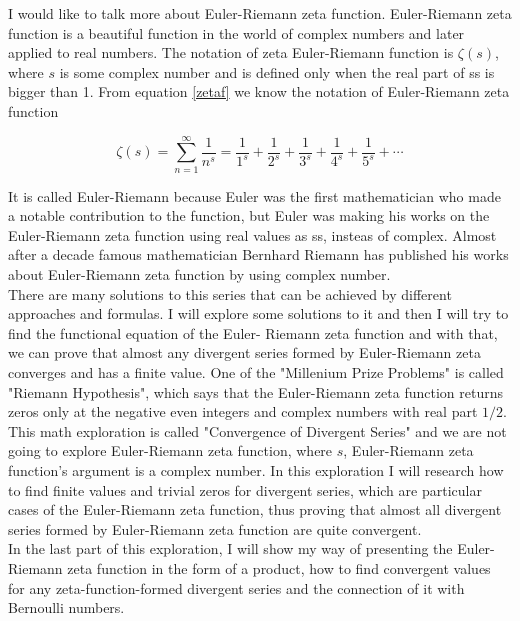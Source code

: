 \documentclass[a4paper]{article}
\begin{document}
I would like to talk more about Euler-Riemann zeta function. Euler-Riemann zeta
function is a beautiful function in the world of complex numbers and later
applied to real numbers. The notation of zeta Euler-Riemann function is
$\zeta(s)$, where $s$ is some complex number and is defined only when the real
part of ss is bigger than 1. From equation \ref{zetaf} we know the notation of
Euler-Riemann zeta function 

\begin{equation*}
  \zeta(s)=\sum_{n=1}^{\infty} \frac{1}{n^s}=\frac{1}{1^s}+\frac{1}{2^s}+\frac{1}{3^s}+
  \frac{1}{4^s}+\frac{1}{5^s}+\cdots
  \end{equation*}

It is called Euler-Riemann because Euler was the first mathematician who made a
notable contribution to the function, but Euler was making his works on the
Euler-Riemann zeta function using real values as ss, insteas of complex. Almost
after a decade famous mathematician Bernhard Riemann has published his works
about Euler-Riemann zeta function by using complex number.\\

There are many solutions to this series that can be achieved by different
approaches and formulas. I will explore some solutions to it and then I will try
to find the functional equation of the Euler- Riemann zeta function and with
that, we can prove that almost any divergent series formed by Euler-Riemann zeta
converges and has a finite value. One of the "Millenium Prize Problems" is
called "Riemann Hypothesis", which says that the Euler-Riemann zeta function
returns zeros only at the negative even integers and complex numbers with real
part $1/2$.\\

This math exploration is called "Convergence of Divergent Series" and we are not
going to explore Euler-Riemann zeta function, where $s$, Euler-Riemann zeta
function's argument is a complex number. In this exploration I will research how
to find finite values and trivial zeros for divergent series, which are
particular cases of the Euler-Riemann zeta function, thus proving that almost
all divergent series formed by Euler-Riemann zeta function are quite
convergent.\\

In the last part of this exploration, I will show my way of presenting the
Euler-Riemann zeta function in the form of a product, how to find convergent
values for any zeta-function-formed divergent series and the connection of it
with Bernoulli numbers. 
\end{document}
